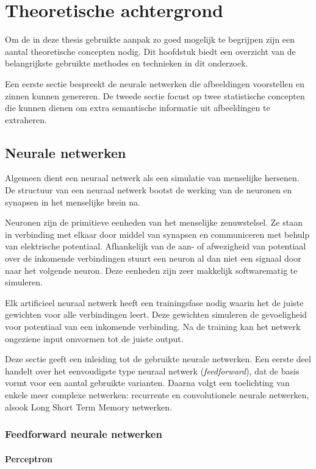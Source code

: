 \chapter{Theoretische achtergrond}
\label{hst-theorie}
Om de in deze thesis gebruikte aanpak zo goed mogelijk te begrijpen zijn een aantal theoretische concepten nodig. Dit hoofdstuk biedt een overzicht van de belangrijkste gebruikte methodes en technieken in dit onderzoek.

Een eerste sectie bespreekt de neurale netwerken die afbeeldingen voorstellen en zinnen kunnen genereren. De tweede sectie focust op twee statistische concepten die kunnen dienen om extra semantische informatie uit afbeeldingen te extraheren. 

\section{Neurale netwerken}
Algemeen dient een neuraal netwerk als een simulatie van menselijke hersenen. De structuur van een neuraal netwerk bootst de werking van de neuronen en synapsen in het menselijke brein na. 

Neuronen zijn de primitieve eenheden van het menselijke zenuwstelsel. Ze staan in verbinding met elkaar door middel van synapsen en communiceren met behulp van elektrische potentiaal. Afhankelijk van de aan- of afwezigheid van potentiaal over de inkomende verbindingen stuurt een neuron al dan niet een signaal door naar het volgende neuron. Deze eenheden zijn zeer makkelijk softwarematig te simuleren.

Elk artificieel neuraal netwerk heeft een trainingsfase nodig waarin het de juiste gewichten voor alle verbindingen leert. Deze gewichten simuleren de gevoeligheid voor potentiaal van een inkomende verbinding. Na de training kan het netwerk ongeziene input omvormen tot de juiste output.

Deze sectie geeft een inleiding tot de gebruikte neurale netwerken. Een eerste deel handelt over het eenvoudigste type neuraal netwerk (\emph{feedforward}), dat de basis vormt voor een aantal gebruikte varianten. Daarna volgt een toelichting van enkele meer complexe netwerken: recurrente en convolutionele neurale netwerken, alsook Long Short Term Memory netwerken.

\subsection{Feedforward neurale netwerken}
\subsubsection{Perceptron} %
\label{par:perceptron}

